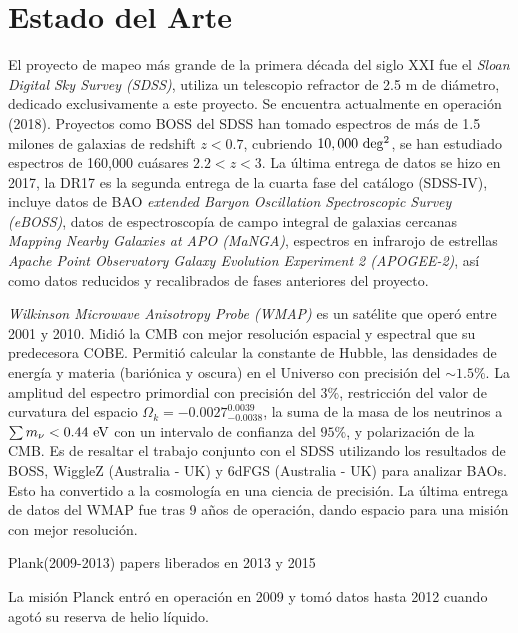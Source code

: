 \documentclass[preprint]{aastex62}
\begin{document}
  \section{Estado del Arte}

  El proyecto de mapeo más grande de la primera década del siglo XXI fue el \textit{Sloan Digital
    Sky Survey (SDSS)},  utiliza un telescopio refractor de 2.5 m de diámetro, dedicado
  exclusivamente a este proyecto. Se encuentra actualmente en operación (2018).
  Proyectos como BOSS del SDSS han tomado espectros de más de 1.5 milones de galaxias de redshift
  $z<0.7$, cubriendo $10,000 \rm~deg^2$, se han estudiado espectros de 160,000 cuásares
  $2.2<z<3$.
  La última entrega de datos se hizo en 2017, la DR17 es la segunda entrega de la cuarta fase del
  catálogo (SDSS-IV), incluye datos de BAO \textit{extended Baryon Oscillation Spectroscopic Survey
    (eBOSS)}, datos de espectroscopía de campo integral de galaxias cercanas \textit{Mapping Nearby
    Galaxies at APO (MaNGA)}, espectros en infrarojo de estrellas \textit{Apache Point Observatory
    Galaxy Evolution Experiment 2 (APOGEE-2)}, así como datos reducidos y recalibrados de fases
  anteriores del proyecto. \citep{SDSS-DR14-2017}

  
  
  \textit{Wilkinson Microwave Anisotropy Probe (WMAP)} es un satélite que operó entre 2001 y 2010.
  Midió la CMB con mejor resolución espacial y espectral que su predecesora COBE. Permitió calcular
  la constante de Hubble, las densidades de energía y materia (bariónica y oscura) en
  el Universo con precisión del $\sim 1.5\%$. La amplitud del espectro primordial con precisión del
  $3\%$, restricción del valor de curvatura del espacio $\Omega_k = -0.0027^{0.0039}_{-0.0038}$, la suma
  de la masa de los neutrinos a $\sum m_\nu < 0.44 \rm~eV$ con un intervalo de confianza del $95\%$,
  y polarización de la CMB. Es de resaltar el trabajo conjunto con el SDSS utilizando los resultados
  de BOSS, WiggleZ (Australia - UK) y 6dFGS (Australia - UK) para analizar BAOs.
  Esto ha convertido a la cosmología en una ciencia de precisión.
  La última entrega de datos del WMAP fue tras 9 años de operación, dando espacio para una misión con
  mejor resolución. \citep{WMAP2013}


  
  Plank(2009-2013) papers liberados en 2013 y 2015

  La misión Planck entró en operación en 2009 y tomó datos hasta 2012 cuando agotó su reserva de helio
  líquido.
\end{document}
